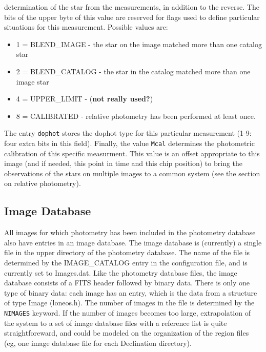 \documentclass{article}
\newcommand{\note}[1]{({\bf #1})}
\begin{document}
determination of the star from the measurements, in addition to the
reverse.  The bits of the upper byte of this value are reserved for
flags used to define particular situations for this measurement.
Possible values are:
\begin{itemize}
\item 1 = BLEND\_IMAGE - the star on the image matched more than one
  catalog star
\item 2 = BLEND\_CATALOG - the star in the catalog matched more than
  one image star
\item 4 = UPPER\_LIMIT - \note{not really used?}
\item 8 = CALIBRATED - relative photometry has been performed at least
  once.
\end{itemize}
The entry {\tt dophot} stores the dophot type for this particular
measurement (1-9: four extra bits in this field).   
Finally, the value {\tt Mcal} determines the photometric calibration
of this specific measurment.  This value is an offset appropriate to
this image (and if needed, this point in time and this chip position)
to bring the observations of the stars on multiple images to a common
system (see the section on relative photometry).

\subsection{Image Database}

All images for which photometry has been included in the photometry
database also have entries in an image database.  The image database
is (currently) a single file in the upper directory of the photometry
database.  The name of the file is determined by the IMAGE\_CATALOG
entry in the configuration file, and is currently set to Images.dat.
Like the photometry database files, the image database consists of a
FITS header followed by binary data.  There is only one type of binary
data: each image has an entry, which is the data from a structure of
type Image (loneos.h).  The number of images in the file is determined
by the {\tt NIMAGES} keyword.  If the number of images becomes too
large, extrapolation of the system to a set of image database files
with a reference list is quite straightforeward, and could be modeled
on the organization of the region files (eg, one image database file
for each Declination directory).
\end{document}
